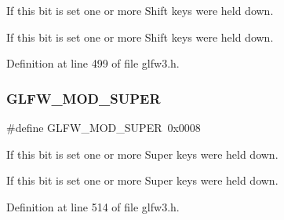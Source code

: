 If this bit is set one or more Shift keys were held down. 

If this bit is set one or more Shift keys were held down. 

Definition at line 499 of file glfw3.\+h.

\mbox{\label{group__mods_ga6b64ba10ea0227cf6f42efd0a220aba1}} 
\subsubsection{\texorpdfstring{GLFW\_MOD\_SUPER}{GLFW\_MOD\_SUPER}}
{\footnotesize\ttfamily \#define G\+L\+F\+W\+\_\+\+M\+O\+D\+\_\+\+S\+U\+P\+ER~0x0008}



If this bit is set one or more Super keys were held down. 

If this bit is set one or more Super keys were held down. 

Definition at line 514 of file glfw3.\+h.

